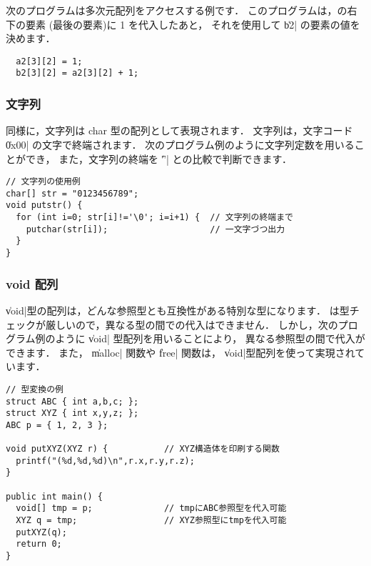 次のプログラムは多次元配列をアクセスする例です．
このプログラムは，の右下の要素
(最後の要素)に 1 を代入したあと，
それを使用して \|b2| の要素の値を決めます．

\begin{mylist}
\begin{verbatim}
  a2[3][2] = 1;
  b2[3][2] = a2[3][2] + 1;
\end{verbatim}
\end{mylist}

\subsubsection{文字列}

\cl 同様に，文字列は char 型の配列として表現されます．
文字列は，文字コード \|0x00| の文字で終端されます．
次のプログラム例のように文字列定数を用いることができ，
また，文字列の終端を \|'\0'| との比較で判断できます．

\begin{mylist}
\begin{verbatim}
// 文字列の使用例
char[] str = "0123456789";
void putstr() {
  for (int i=0; str[i]!='\0'; i=i+1) {  // 文字列の終端まで
    putchar(str[i]);                    // 一文字づつ出力
  }
}
\end{verbatim}
\end{mylist}

\subsubsection{ void 配列}

\|void|型の配列は，どんな参照型とも互換性がある特別な型になります．
\cmml は型チェックが厳しいので，異なる型の間での代入はできません．
しかし，次のプログラム例のように \|void| 型配列を用いることにより，
異なる参照型の間で代入ができます．
また， \|malloc| 関数や \|free| 関数は，
\|void|型配列を使って実現されています．

\begin{mylist}
\begin{verbatim}
// 型変換の例
struct ABC { int a,b,c; };
struct XYZ { int x,y,z; };
ABC p = { 1, 2, 3 };

void putXYZ(XYZ r) {           // XYZ構造体を印刷する関数
  printf("(%d,%d,%d)\n",r.x,r.y,r.z);
}

public int main() {
  void[] tmp = p;              // tmpにABC参照型を代入可能
  XYZ q = tmp;                 // XYZ参照型にtmpを代入可能
  putXYZ(q);
  return 0;
}
\end{verbatim}
\end{mylist}

